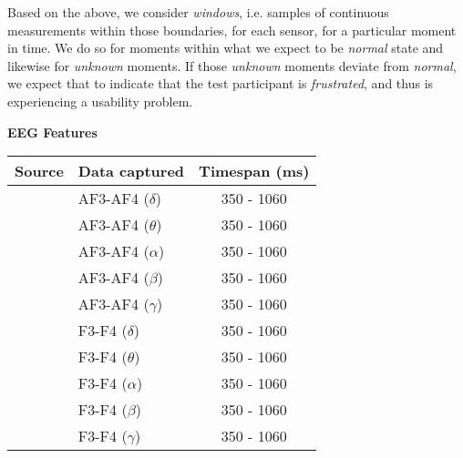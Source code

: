 Based on the above, we consider \textit{windows}, i.e. samples of continuous measurements within those boundaries, for
each sensor, for a particular moment in time. We do so for moments within what we expect to be \textit{normal} state and
likewise for \textit{unknown} moments. If those \textit{unknown} moments deviate from \textit{normal}, we expect that to
indicate that the test participant is \textit{frustrated}, and thus is experiencing a usability problem.

\begin{table}[H]
    \centering
    {\large \textbf{EEG Features}}\vspace{2pt}
    \begin{tabularx}{\columnwidth}{cXc}
        \toprule
        \textbf{Source} & \textbf{Data captured} & \textbf{Timespan (ms)} \\
        \midrule
        \small{\cite{eeg_music_listening,eeg_timespan_1,eeg_electrodes_1,eeg_electrodes_0}} & AF3-AF4 ($\delta$) & 350 - 1060 \\
        \small{\cite{eeg_music_listening,eeg_timespan_1,eeg_electrodes_1,eeg_electrodes_0}} & AF3-AF4 ($\theta$) & 350 - 1060 \\
        \small{\cite{eeg_music_listening,eeg_timespan_1,eeg_electrodes_1,eeg_electrodes_0}} & AF3-AF4 ($\alpha$) & 350 - 1060 \\
        \small{\cite{eeg_music_listening,eeg_timespan_1,eeg_electrodes_1,eeg_electrodes_0}} & AF3-AF4 ($\beta$)  & 350 - 1060 \\
        \small{\cite{eeg_music_listening,eeg_timespan_1,eeg_electrodes_1,eeg_electrodes_0}} & AF3-AF4 ($\gamma$) & 350 - 1060 \\
        \small{\cite{eeg_music_listening,eeg_timespan_1,eeg_electrodes_1,eeg_electrodes_0}} & F3-F4 ($\delta$) & 350 - 1060 \\
        \small{\cite{eeg_music_listening,eeg_timespan_1,eeg_electrodes_1,eeg_electrodes_0}} & F3-F4 ($\theta$) & 350 - 1060 \\
        \small{\cite{eeg_music_listening,eeg_timespan_1,eeg_electrodes_1,eeg_electrodes_0}} & F3-F4 ($\alpha$) & 350 - 1060 \\
        \small{\cite{eeg_music_listening,eeg_timespan_1,eeg_electrodes_1,eeg_electrodes_0}} & F3-F4 ($\beta$)  & 350 - 1060 \\
        \small{\cite{eeg_music_listening,eeg_timespan_1,eeg_electrodes_1,eeg_electrodes_0}} & F3-F4 ($\gamma$) & 350 - 1060 \\
        \bottomrule
    \end{tabularx}
    \label{[TABLE] features eeg}
\end{table}

